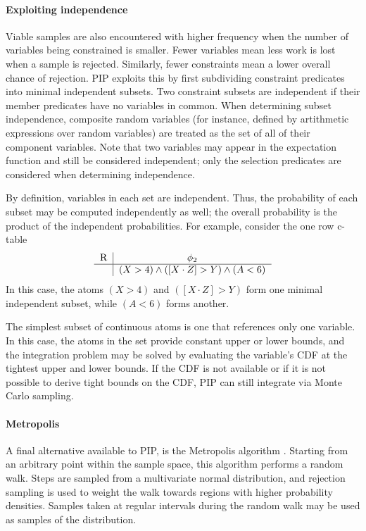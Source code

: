 \paragraph{Exploiting independence}
\label{subsec:independence}
Viable samples are also encountered with higher frequency when the number of variables being constrained is smaller.  Fewer variables mean less work is lost when a sample is rejected.  Similarly, fewer constraints mean a lower overall chance of rejection.  PIP exploits this by first subdividing constraint predicates into minimal independent subsets.  Two constraint subsets are independent if their member predicates have no variables in common.  When determining subset independence, composite random variables (for instance, defined by artithmetic expressions over random variables) are treated as the set of all of their component variables.  Note that two variables may appear in the expectation function and still be considered independent; only the selection predicates are considered when determining independence.

By definition, variables in each set are independent.  Thus, the probability of each subset may be computed independently as well; the overall probability is the product of the independent probabilities.  For example, consider the one row c-table 
\[
\begin{tabular}{c|c}
R & $\phi_2$ \\
\hline
& $(X > 4) \wedge ([X\cdot Z] > Y) \wedge (A < 6)$ \\
\end{tabular}
\]
In this case, the atoms $(X > 4)$ and $([X\cdot Z] > Y)$ form one minimal independent subset, while $(A < 6)$ forms another.


The simplest subset of continuous atoms is one that references only one variable.  In this case, the atoms in the set provide constant upper or lower bounds, and the integration problem may be solved by evaluating the variable's CDF at the tightest upper and lower bounds.  If the CDF is not available or if it is not possible to derive tight bounds on the CDF, PIP can still integrate via Monte Carlo sampling.  

\paragraph{Metropolis}
A final alternative available to PIP, is the
Metropolis  algorithm \cite{metropolis}.   Starting from  an arbitrary
point within the sample space,  this algorithm performs a random walk.
Steps  are  sampled  from  a  multivariate  normal  distribution,  and
rejection sampling  is used  to weight the  walk towards  regions with
higher  probability  densities.  Samples  taken  at regular  intervals
during the random walk may be used as samples of the distribution.

